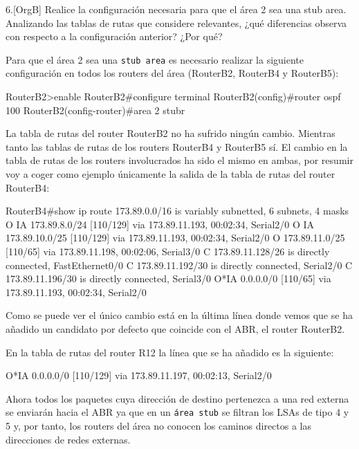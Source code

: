 \begin{ejer}
6.[OrgB]  Realice la configuración necesaria para que el área 2 sea una stub area. Analizando las tablas de rutas que considere relevantes, ¿qué diferencias observa con respecto a la configuración anterior? ¿Por qué?
\end{ejer}
\par Para que el área 2 sea una \texttt{stub area} es necesario realizar la siguiente configuración en todos los routers del área (RouterB2, RouterB4 y RouterB5):
\begin{listing}[style=consola]
RouterB2>enable
RouterB2#configure terminal
RouterB2(config)#router ospf 100
RouterB2(config-router)#area 2 stubr
\end{listing}
\par La tabla de rutas del router RouterB2 no ha sufrido ningún cambio. Mientras tanto las tablas de rutas de los routers RouterB4 y RouterB5 sí. El cambio en la tabla de rutas de los routers involucrados ha sido el mismo en ambas, por resumir voy a coger como ejemplo únicamente la salida de la tabla de rutas del router RouterB4:
\begin{listing}[style=consola]
RouterB4#show ip route
     173.89.0.0/16 is variably subnetted, 6 subnets, 4 masks
O IA    173.89.8.0/24 [110/129] via 173.89.11.193, 00:02:34, Serial2/0
O IA    173.89.10.0/25 [110/129] via 173.89.11.193, 00:02:34, Serial2/0
O       173.89.11.0/25 [110/65] via 173.89.11.198, 00:02:06, Serial3/0
C       173.89.11.128/26 is directly connected, FastEthernet0/0
C       173.89.11.192/30 is directly connected, Serial2/0
C       173.89.11.196/30 is directly connected, Serial3/0
O*IA 0.0.0.0/0 [110/65] via 173.89.11.193, 00:02:34, Serial2/0
\end{listing}
\par Como se puede ver el único cambio está en la última línea donde vemos que se ha añadido un candidato por defecto que coincide con el ABR, el router RouterB2.\\
\par En la tabla de rutas del router R12 la línea que se ha añadido es la siguiente: 
\begin{listing}[style=consola]
O*IA 0.0.0.0/0 [110/129] via 173.89.11.197, 00:02:13, Serial2/0
\end{listing}
\par Ahora todos los paquetes cuya dirección de destino pertenezca a una red externa se enviarán hacia el ABR ya que en un \texttt{área stub} se filtran los LSAs de tipo 4 y 5 y, por tanto, los routers del área no conocen los caminos directos a las direcciones de redes externas.

